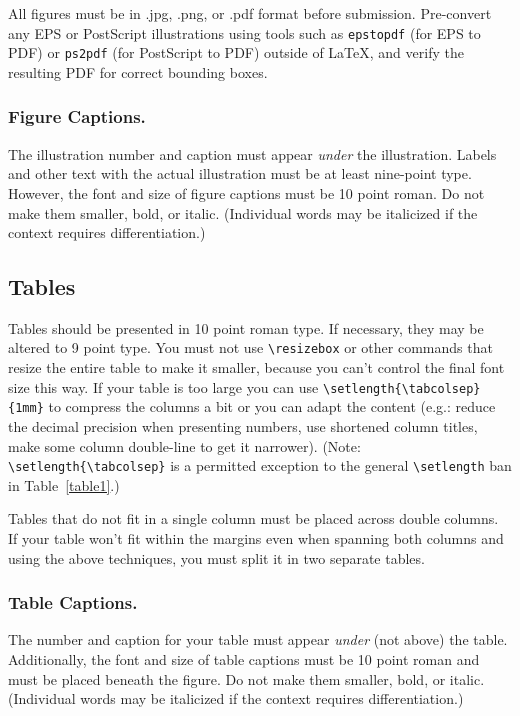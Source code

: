 All figures must be in .jpg, .png, or .pdf format before submission. Pre-convert any EPS or PostScript illustrations using tools such as \texttt{epstopdf} (for EPS to PDF) or \texttt{ps2pdf} (for PostScript to PDF) outside of \LaTeX{}, and verify the resulting PDF for correct bounding boxes.

\subsubsection {Figure Captions.}The illustration number and caption must appear \textit{under} the illustration. Labels and other text with the actual illustration must be at least nine-point type. However, the font and size of figure captions must be 10 point roman. Do not make them smaller, bold, or italic. (Individual words may be italicized if the context requires differentiation.)

\subsection{Tables}

Tables should be presented in 10 point roman type. If necessary, they may be altered to 9 point type. You must not use \texttt{\textbackslash resizebox} or other commands that resize the entire table to make it smaller, because you can't control the final font size this way.
If your table is too large you can use \texttt{\textbackslash setlength\{\textbackslash tabcolsep\}\{1mm\}} to compress the columns a bit or you can adapt the content (e.g.: reduce the decimal precision when presenting numbers, use shortened column titles, make some column double-line to get it narrower). (Note: \texttt{\textbackslash setlength\{\textbackslash tabcolsep\}} is a permitted exception to the general \texttt{\textbackslash setlength} ban in Table~\ref{table1}.)

Tables that do not fit in a single column must be placed across double columns. If your table won't fit within the margins even when spanning both columns and using the above techniques, you must split it in two separate tables.

\subsubsection {Table Captions.} The number and caption for your table must appear \textit{under} (not above) the table.  Additionally, the font and size of table captions must be 10 point roman and must be placed beneath the figure. Do not make them smaller, bold, or italic. (Individual words may be italicized if the context requires differentiation.)



